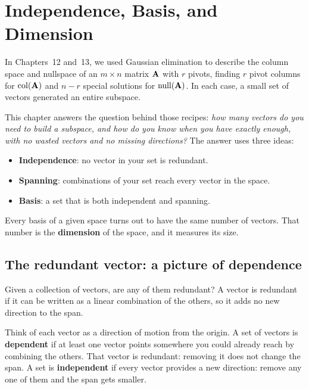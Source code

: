 \chapter{Independence, Basis, and Dimension}

In Chapters~12 and~13, we used Gaussian elimination to describe the column space and nullspace
of an $m\times n$ matrix $\mathbf{A}$ with $r$ pivots,
finding $r$ pivot columns for $\operatorname{col}(\mathbf{A})$ and $n - r$ special solutions for $\operatorname{null}(\mathbf{A})$.
In each case, a small set of vectors generated an entire subspace.

This chapter answers the question behind those recipes: \emph{how many vectors do you
need to build a subspace, and how do you know when you have exactly enough, with no wasted vectors
and no missing directions?} The answer uses three ideas:
\begin{itemize}
  \item \textbf{Independence}: no vector in your set is redundant.
  \item \textbf{Spanning}: combinations of your set reach every vector in the space.
  \item \textbf{Basis}: a set that is both independent and spanning.
\end{itemize}
Every basis of a given space turns out to have the same number of vectors. That number is
the \textbf{dimension} of the space, and it measures its size.

\chapterline

\section{The redundant vector: a picture of dependence}
\label{ch14:redundant}

Given a collection of vectors, are any of them redundant? A vector is redundant
if it can be written as a linear combination of the others, so it adds no new
direction to the span.

\begin{intuitionbox}
Think of each vector as a direction of motion from the origin. A set of vectors is
\textbf{dependent} if at least one vector points somewhere you could already
reach by combining the others. That vector is redundant: removing it does not
change the span. A set is \textbf{independent} if every vector provides a
new direction: remove any one of them and the span gets smaller.
\end{intuitionbox}

